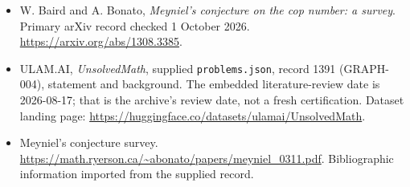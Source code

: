 \documentclass[11pt,a4paper]{article}
\begin{document}
{\small

\begin{itemize}
\item[E1] W. Baird and A. Bonato, \emph{Meyniel's conjecture on the cop number: a survey}. Primary arXiv record checked 1 October 2026. \url{https://arxiv.org/abs/1308.3385}.


\item[\hypertarget{source:1391:1}{S1}] ULAM.AI, \emph{UnsolvedMath}, supplied \texttt{problems.json}, record 1391 (GRAPH-004), statement and background. The embedded literature-review date is 2026-08-17; that is the archive’s review date, not a fresh certification. Dataset landing page: \url{https://huggingface.co/datasets/ulamai/UnsolvedMath}.

\item[\hypertarget{source:1391:2}{S2}] Meyniel's conjecture survey. \url{https://math.ryerson.ca/~abonato/papers/meyniel_0311.pdf}. Bibliographic information imported from the supplied record.

\end{itemize}

}

\label{end:1391}
\end{document}
